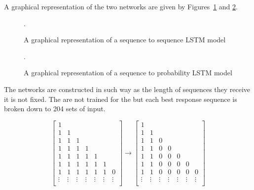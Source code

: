 A graphical representation of the two networks are given by Figures~\ref{fig:sequence_to_sequence} and
\ref{fig:sequence_to_probability}.

\begin{figure}[!htbp]
    \centering
    
    \caption{A graphical representation of a sequence to sequence LSTM model}.\label{fig:sequence_to_sequence}
\end{figure}

\begin{figure}[!htbp]
    \centering
    
    \caption{A graphical representation of a sequence to probability LSTM model}.\label{fig:sequence_to_probability}
\end{figure}

The networks are constructed in such way as the length of sequences they receive
it is not fixed. The are not trained for the \totalsequences but each
best response sequence is broken down to 204 sets of input.

\begin{equation}
    \begin{bmatrix}
        1 &  &  \\
        1 & 1 &  \\
        1 & 1 & 1 \\
        1 & 1 & 1 & 1 \\
        1 & 1 & 1 & 1 & 1 \\
        1 & 1 & 1 & 1 & 1 & 1\\
        1 & 1 & 1 & 1 & 1 & 1 & 0 \\
        \vdots & \vdots & \vdots & \vdots & \vdots & \vdots & \vdots \\
    \end{bmatrix} \to 
    \begin{bmatrix}
        1 &  &  \\
        1 & 1 &  \\
        1 & 1 & 0 \\
        1 & 1 & 0 & 0 \\
        1 & 1 & 0 & 0 & 0 \\
        1 & 1 & 0 & 0 & 0 & 0\\
        1 & 1 & 0 & 0 & 0 & 0 & 0 \\
        \vdots & \vdots & \vdots & \vdots & \vdots & \vdots & \vdots \\
    \end{bmatrix}
\end{equation}

